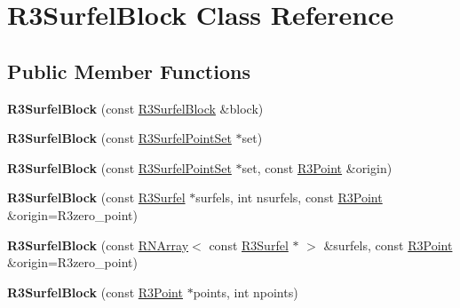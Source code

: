 \hypertarget{class_r3_surfel_block}{}\section{R3\+Surfel\+Block Class Reference}
\label{class_r3_surfel_block}
\subsection*{Public Member Functions}
\begin{DoxyCompactItemize}
\item 
{\bfseries R3\+Surfel\+Block} (const \hyperlink{class_r3_surfel_block}{R3\+Surfel\+Block} \&block)\hypertarget{class_r3_surfel_block_a5387f9b284b401a4b966341ccead0243}{}\label{class_r3_surfel_block_a5387f9b284b401a4b966341ccead0243}

\item 
{\bfseries R3\+Surfel\+Block} (const \hyperlink{class_r3_surfel_point_set}{R3\+Surfel\+Point\+Set} $\ast$set)\hypertarget{class_r3_surfel_block_a5a8f2a24191347abe823162334c63950}{}\label{class_r3_surfel_block_a5a8f2a24191347abe823162334c63950}

\item 
{\bfseries R3\+Surfel\+Block} (const \hyperlink{class_r3_surfel_point_set}{R3\+Surfel\+Point\+Set} $\ast$set, const \hyperlink{class_r3_point}{R3\+Point} \&origin)\hypertarget{class_r3_surfel_block_a4cce6c37c211426d20a58c0fb3ddd79c}{}\label{class_r3_surfel_block_a4cce6c37c211426d20a58c0fb3ddd79c}

\item 
{\bfseries R3\+Surfel\+Block} (const \hyperlink{class_r3_surfel}{R3\+Surfel} $\ast$surfels, int nsurfels, const \hyperlink{class_r3_point}{R3\+Point} \&origin=R3zero\+\_\+point)\hypertarget{class_r3_surfel_block_ac573bfed043129596e25a4062a4f34e2}{}\label{class_r3_surfel_block_ac573bfed043129596e25a4062a4f34e2}

\item 
{\bfseries R3\+Surfel\+Block} (const \hyperlink{class_r_n_array}{R\+N\+Array}$<$ const \hyperlink{class_r3_surfel}{R3\+Surfel} $\ast$ $>$ \&surfels, const \hyperlink{class_r3_point}{R3\+Point} \&origin=R3zero\+\_\+point)\hypertarget{class_r3_surfel_block_ab10dcad05fddbad64725fe91415c52cb}{}\label{class_r3_surfel_block_ab10dcad05fddbad64725fe91415c52cb}

\item 
{\bfseries R3\+Surfel\+Block} (const \hyperlink{class_r3_point}{R3\+Point} $\ast$points, int npoints)\hypertarget{class_r3_surfel_block_adfe769fa92c30780cae552a7df1683e0}{}\label{class_r3_surfel_block_adfe769fa92c30780cae552a7df1683e0}


\end{DoxyCompactItemize}
